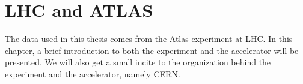 \chapter{LHC and ATLAS}
\label{sec:LHCandATLAS}
The data used in this thesis comes from the Atlas experiment at LHC. In this chapter,  a brief introduction to both the experiment and the accelerator will be presented. We will also get a small incite to the organization behind the experiment and the accelerator, namely CERN. 





